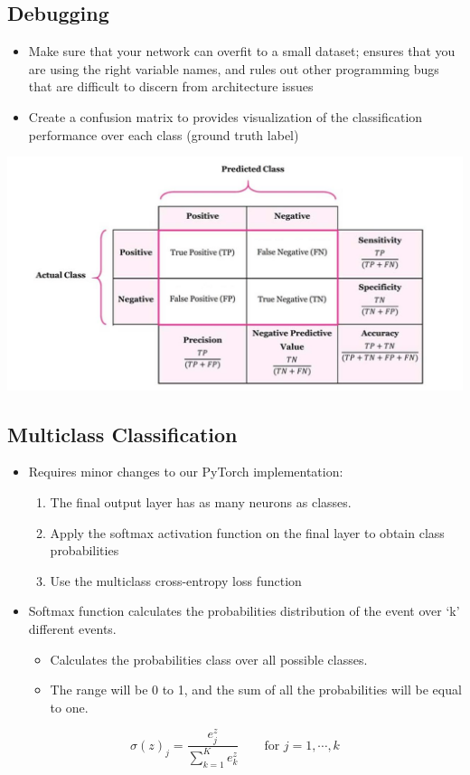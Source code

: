 \documentclass[11pt]{article}
\begin{document}
\subsection{Debugging}
\begin{itemize}
\item Make sure that your network can overfit to a small dataset; ensures that you are using the right variable names, and rules out other programming bugs that are difficult to discern from architecture issues
\item Create a confusion matrix to provides visualization of the classification performance over each class (ground truth label)
\end{itemize}
\begin{center}
\includegraphics[scale=0.5]{images/conf.png}
\end{center}


\subsection{Multiclass Classification}
\begin{itemize}
\item Requires minor changes to our PyTorch implementation:
\begin{enumerate}
\item The final output layer has as many neurons as classes.
\item Apply the softmax activation function on the final layer to obtain class probabilities
\item Use the multiclass cross-entropy loss function
\end{enumerate}
\item Softmax function calculates the probabilities distribution of the event over ‘k’ different events.
\begin{itemize}
\item Calculates the probabilities class over all possible classes.
\item The range will be 0 to 1, and the sum of all the probabilities will be equal to one.
\end{itemize}
\end{itemize}
$$ \sigma (z) _j = \frac{e^z_j}{\sum_{k=1}^K e^z_k} \quad \quad \text{for        } j = 1, \cdots, k$$
\end{document}
